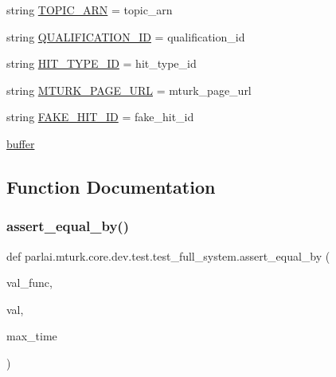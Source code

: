 \begin{DoxyCompactItemize}
\item 
string \hyperlink{namespaceparlai_1_1mturk_1_1core_1_1dev_1_1test_1_1test__full__system_a7202866617a83dc65ebe911529b12c8a}{T\+O\+P\+I\+C\+\_\+\+A\+RN} = \textquotesingle{}topic\+\_\+arn\textquotesingle{}
\item 
string \hyperlink{namespaceparlai_1_1mturk_1_1core_1_1dev_1_1test_1_1test__full__system_a2f7be2ef0f668b58895f28b8d6a8c68e}{Q\+U\+A\+L\+I\+F\+I\+C\+A\+T\+I\+O\+N\+\_\+\+ID} = \textquotesingle{}qualification\+\_\+id\textquotesingle{}
\item 
string \hyperlink{namespaceparlai_1_1mturk_1_1core_1_1dev_1_1test_1_1test__full__system_afe79d339f97e91f52c6f8342cf9ce16a}{H\+I\+T\+\_\+\+T\+Y\+P\+E\+\_\+\+ID} = \textquotesingle{}hit\+\_\+type\+\_\+id\textquotesingle{}
\item 
string \hyperlink{namespaceparlai_1_1mturk_1_1core_1_1dev_1_1test_1_1test__full__system_abc401e8506359cda4708f093069f45ed}{M\+T\+U\+R\+K\+\_\+\+P\+A\+G\+E\+\_\+\+U\+RL} = \textquotesingle{}mturk\+\_\+page\+\_\+url\textquotesingle{}
\item 
string \hyperlink{namespaceparlai_1_1mturk_1_1core_1_1dev_1_1test_1_1test__full__system_a47fef81a6ee68133219bf7bd1859507d}{F\+A\+K\+E\+\_\+\+H\+I\+T\+\_\+\+ID} = \textquotesingle{}fake\+\_\+hit\+\_\+id\textquotesingle{}
\item 
\hyperlink{namespaceparlai_1_1mturk_1_1core_1_1dev_1_1test_1_1test__full__system_a860dcc1ccc00422b6a2312f94d72f751}{buffer}
\end{DoxyCompactItemize}


\subsection{Function Documentation}
\mbox{\label{namespaceparlai_1_1mturk_1_1core_1_1dev_1_1test_1_1test__full__system_a08d3f9d5e50fd752ba609ce51013e4ce}} 
\subsubsection{\texorpdfstring{assert\+\_\+equal\+\_\+by()}{assert\_equal\_by()}}
{\footnotesize\ttfamily def parlai.\+mturk.\+core.\+dev.\+test.\+test\+\_\+full\+\_\+system.\+assert\+\_\+equal\+\_\+by (\begin{DoxyParamCaption}\item[{}]{val\+\_\+func,  }\item[{}]{val,  }\item[{}]{max\+\_\+time }\end{DoxyParamCaption})}



